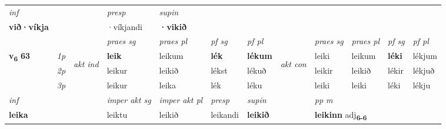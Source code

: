 \begin{longtable}[l]{X>{\footnotesize\itshape}llXXXXlXXXX}
\cmidrule{4-7}
   {\textit{inf}} & &     & \textit{presp} & \textit{supin}   \\*
  {\textbf{við\allowbreak ·víkja}} & &     & ·víkjandi &  \textbf{·vikið}   \\*

\midrule

 & &   & \textit{praes sg}  & \textit{praes pl}    & \textit{ pf sg} & \textit{pf pl} & & \textit{praes sg}  & \textit{praes pl}    & \textit{pf sg} & \textit{pf pl }  \\ \cmidrule{4-7} \cmidrule{9-12}
 \multirow{2}{*}{{{\textbf{v{\textsubscript{6}}} \Large{\textbf{63}}}}}  & 1p & \multirow{3}{*}{\begin{turn}{90}\textit{akt ind}\end{turn}} & \textbf{leik} & leikum & \textbf{lék} & \textbf{lékum} & \multirow{3}{*}{\begin{turn}{90}\textit{akt con}\end{turn}} &leiki & leikum & \textbf{léki} & lékjum\\*
 & 2p &  &  leikur  & leikið & lékst & lékuð & & leikir & leikið & lékir & lékjuð \\*
 & 3p &  & leikur & leika & lék & léku & & leiki & leiki& léki & lékju \\*
\cmidrule{4-7} \cmidrule{9-12}

   {\textit{inf}} & &  & \textit{imper akt sg} & \textit{imper akt pl}   & \textit{presp} & \textit{supin}  && \textit{pp m} \\*
  {\textbf{leika}} & && leiktu  & leikið   & leikandi &  \textbf{leikið}  && \multicolumn{2}{l}{\textbf{leikinn} adj\textbf{\textsubscript{6-6}}} \\*

\midrule


\end{longtable}
